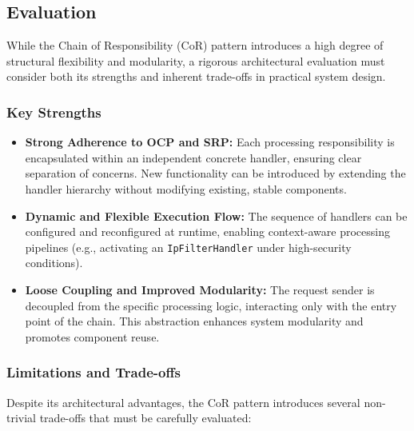 \subsection{Evaluation}

While the Chain of Responsibility (CoR) pattern introduces a high degree of structural flexibility and modularity, a rigorous architectural evaluation must consider both its strengths and inherent trade-offs in practical system design.

\subsubsection{Key Strengths}
\begin{itemize}
    \item \textbf{Strong Adherence to OCP and SRP:} Each processing responsibility is encapsulated within an independent concrete handler, ensuring clear separation of concerns. New functionality can be introduced by extending the handler hierarchy without modifying existing, stable components.
    
    \item \textbf{Dynamic and Flexible Execution Flow:} The sequence of handlers can be configured and reconfigured at runtime, enabling context-aware processing pipelines (e.g., activating an \texttt{IpFilterHandler} under high-security conditions).
    
    \item \textbf{Loose Coupling and Improved Modularity:} The request sender is decoupled from the specific processing logic, interacting only with the entry point of the chain. This abstraction enhances system modularity and promotes component reuse.
\end{itemize}

\subsubsection{Limitations and Trade-offs}
Despite its architectural advantages, the CoR pattern introduces several non-trivial trade-offs that must be carefully evaluated:

